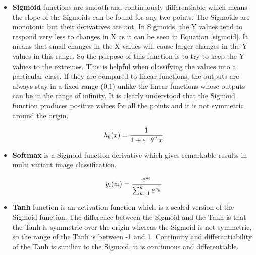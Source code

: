         \begin{itemize}

            \item \textbf{Sigmoid} functions are smooth and continuously differentiable which means the slope of the Sigmoids can be found for any two points.
                    The Sigmoids are monotonic but their derivatives are not.
                    In Sigmoids, the Y values tend to respond very less to changes in X as it can be seen in Equation \eqref{sigmoid}.
                    It means that small changes in the X values will cause larger changes in the Y values in this range.
                    So the purpose of this function is to try to keep the Y values to the extremes.
                    This is helpful when classifying the values into a particular class.
                    If they are compared to linear functions, the outputs are always stay in a fixed range (0,1) unlike the linear functions whose outputs can be in the range of infinity.
                    It is clearly understood that the Sigmoid function produces positive values for all the points and it is not symmetric around the origin.

                    \begin{equation}
                        h_ \theta (x) =  \frac{\mathrm{1} }{\mathrm{1} + e^- \theta^Tx } \label{sigmoid} \\
                    \end{equation}

            \item \textbf{Softmax} is a Sigmoid function derivative which gives remarkable results in multi variant image classification.

                    \begin{equation}
                        y_i(z_i) = \frac{e^{z_i}}{ \sum\nolimits_{k=1}^{k}{e^{z_k}} } \label{softmax} \\
                    \end{equation}

            \item \textbf{Tanh} function is an activation function which is a scaled version of the Sigmoid function.
                    The difference between the Sigmoid and the Tanh is that the Tanh is symmetric over the origin whereas the Sigmoid is not symmetric, so the range of the Tanh is between -1 and 1.
                    Continuity and differantiability of the Tanh is similiar to the Sigmoid, it is continuous and differentiable.


\end{itemize}
